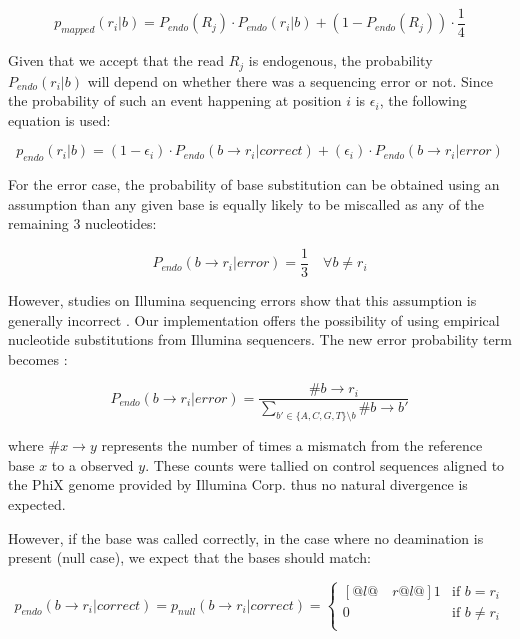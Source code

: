 \documentclass[a4paper,12pt]{article}
\begin{document}
\begin{equation}
p_{mapped}(r_i|b) =  P_{endo}(R_j) \cdot P_{endo} (r_i|b)   + (1-P_{endo}(R_j)) \cdot \frac {1} {4}
\label{eqn:correctmap}
\end{equation}

\noindent Given that we accept that the read $R_j$ is endogenous, the probability $P_{endo} (r_i|b)$ will depend on whether there was a sequencing error or not. Since the probability of such an event happening at position $i$ is $\epsilon_i$, the following equation is used:

\begin{equation}
  p_{endo}(r_i|b)   =  (1-\epsilon_i ) \cdot  P_{endo}( b \to r_i|correct) +  (\epsilon_i) \cdot P_{endo}(  b \to r_i |error)   
  \label{eqn:match}
\end{equation} 

\noindent For the error case, the probability of base substitution can be obtained using an assumption than any given base is equally likely to be miscalled as any of the remaining 3 nucleotides:

\begin{equation}
P_{endo}(  b \to r_i |error)  = \frac {1} {3} \quad \forall b \ne r_i
\end{equation}

\noindent However, studies on Illumina sequencing errors show that this assumption is generally incorrect \cite{illumina error papers}. Our implementation offers the possibility of using empirical nucleotide substitutions from Illumina sequencers. The new error probability term becomes :

\begin{equation}
P_{endo}(  b \to r_i |error)  = \frac { \# b \to r_i } { \sum\limits_{ b' \in \{A,C,G,T\}  \setminus b }  \# b \to b' } 
\end{equation}

\noindent where $\# x \to y$ represents the number of times a mismatch from the reference base $x$ to a observed $y$. These counts were tallied on control sequences aligned to the PhiX genome provided by Illumina Corp. thus no natural divergence is expected. 

However, if the base was called correctly, in the case where no deamination is present (null case), we expect that the bases should match:

\begin{equation}
p_{endo}(b \to r_i | correct) =   p_{null}(b \to r_i | correct)   = \begin{cases}[@{}l@{\quad}r@{}l@{}]
    1  &  \text{if }  b = r_i    \\
    0 &  \text{if }  b \ne r_i    \\
  \end{cases}
\label{eqn:nullmatch}
\end{equation} 
\end{document}
